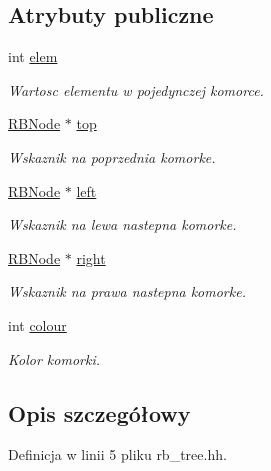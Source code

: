 \subsection*{Atrybuty publiczne}
\begin{DoxyCompactItemize}
\item 
int \hyperlink{struct_r_b_node_a5c76fd9ee8fa04e10e59509852d91bb5}{elem}
\begin{DoxyCompactList}\small\item\em Wartosc elementu w pojedynczej komorce. \end{DoxyCompactList}\item 
\hyperlink{struct_r_b_node}{R\-B\-Node} $\ast$ \hyperlink{struct_r_b_node_ae027bf4a39cb48c3b94ac806b3c6e74d}{top}
\begin{DoxyCompactList}\small\item\em Wskaznik na poprzednia komorke. \end{DoxyCompactList}\item 
\hyperlink{struct_r_b_node}{R\-B\-Node} $\ast$ \hyperlink{struct_r_b_node_a3345545f8a1678010bca11b5f7153a4a}{left}
\begin{DoxyCompactList}\small\item\em Wskaznik na lewa nastepna komorke. \end{DoxyCompactList}\item 
\hyperlink{struct_r_b_node}{R\-B\-Node} $\ast$ \hyperlink{struct_r_b_node_af82826872827c548a5713eb84f264767}{right}
\begin{DoxyCompactList}\small\item\em Wskaznik na prawa nastepna komorke. \end{DoxyCompactList}\item 
int \hyperlink{struct_r_b_node_a37ed571d3fcd839972379cc10800c4ab}{colour}
\begin{DoxyCompactList}\small\item\em Kolor komorki. \end{DoxyCompactList}\end{DoxyCompactItemize}


\subsection{Opis szczegółowy}


Definicja w linii 5 pliku rb\-\_\-tree.\-hh.



